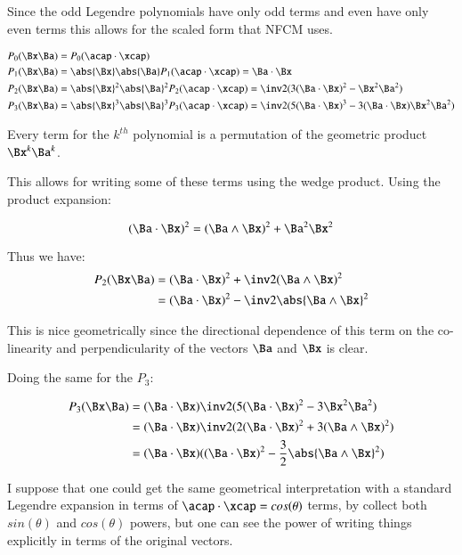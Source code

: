 Since the odd Legendre polynomials have only odd terms and even have only even terms this allows for
the scaled form that NFCM uses.

\begin{align*}
P_0(\bxa) &= P_0(\costheta) \\
P_1(\bxa) &= \abs{\Bx}\abs{\Ba} P_1(\costheta) = \Ba \cdot \Bx \\
P_2(\bxa) &= \abs{\Bx}^2\abs{\Ba}^2 P_2(\costheta) = \half(3(\Ba \cdot \Bx)^2 - \Bx^2\Ba^2) \\
P_3(\bxa) &= \abs{\Bx}^3\abs{\Ba}^3 P_3(\costheta) = \half(5(\Ba \cdot \Bx)^3 - 3(\Ba \cdot \Bx) \Bx^2\Ba^2) \\
\end{align*}

Every term for the $k^{th}$ polynomial is a permutation of the geometric product $\Bx^k\Ba^k$.

This allows for writing some of these terms using the wedge product.  Using the product expansion:

\[
(\Ba \cdot \Bx)^2 = ( \Ba \wedge \Bx )^2 + \Ba^2 \Bx^2
\]

Thus we have:
\begin{align*}
P_2(\bxa)
&= (\Ba \cdot \Bx)^2 + \half(\Ba \wedge \Bx)^2 \\
&= (\Ba \cdot \Bx)^2 - \half\abs{\Ba \wedge \Bx}^2 \\
\end{align*}

This is nice geometrically since the directional dependence of this term on the co-linearity and 
perpendicularity of the vectors $\Ba$ and $\Bx$ is clear.

Doing the same for the $P_3$:

\begin{align*}
P_3(\bxa) &= (\Ba \cdot \Bx)\half(5(\Ba \cdot \Bx)^2 - 3\Bx^2\Ba^2) \\
          &= (\Ba \cdot \Bx)\half(2(\Ba \cdot \Bx)^2 + 3(\Ba \wedge \Bx)^2) \\
          &= (\Ba \cdot \Bx)((\Ba \cdot \Bx)^2 - \frac{3}{2}\abs{\Ba \wedge \Bx}^2) \\
\end{align*}

I suppose that one could get the same geometrical interpretation with a standard Legendre expansion in terms of $\costheta = cos(\theta)$ terms, by collect both $sin(\theta)$ and $cos(\theta)$ powers, but one
can see the power of writing things explicitly in terms of the original vectors.

